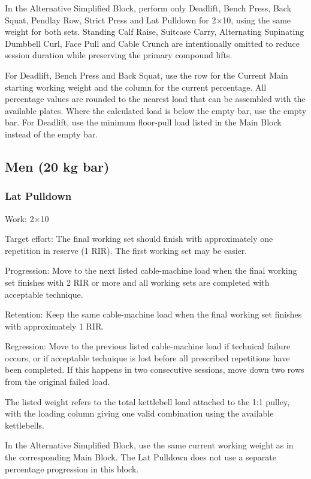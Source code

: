 \documentclass[11pt,a4paper]{article}
\begin{document}
In the Alternative Simplified Block, perform only Deadlift, Bench Press, Back Squat, Pendlay Row, Strict Press and Lat Pulldown for 2$\times$10, using the same weight for both sets. Standing Calf Raise, Suitcase Carry, Alternating Supinating Dumbbell Curl, Face Pull and Cable Crunch are intentionally omitted to reduce session duration while preserving the primary compound lifts.

For Deadlift, Bench Press and Back Squat, use the row for the Current Main starting working weight and the column for the current percentage. All percentage values are rounded to the nearest load that can be assembled with the available plates. Where the calculated load is below the empty bar, use the empty bar. For Deadlift, use the minimum floor-pull load listed in the Main Block instead of the empty bar.

\newpage
\subsection{Men (20 kg bar)}

\subsubsection{Lat Pulldown}

Work: 2$\times$10

Target effort: The final working set should finish with approximately one repetition in reserve (1 RIR). The first working set may be easier.

Progression: Move to the next listed cable-machine load when the final working set finishes with 2 RIR or more and all working sets are completed with acceptable technique.

Retention: Keep the same cable-machine load when the final working set finishes with approximately 1 RIR.

Regression: Move to the previous listed cable-machine load if technical failure occurs, or if acceptable technique is lost before all prescribed repetitions have been completed. If this happens in two consecutive sessions, move down two rows from the original failed load.

The listed weight refers to the total kettlebell load attached to the 1:1 pulley, with the loading column giving one valid combination using the available kettlebells.

In the Alternative Simplified Block, use the same current working weight as in the corresponding Main Block. The Lat Pulldown does not use a separate percentage progression in this block.
\end{document}
